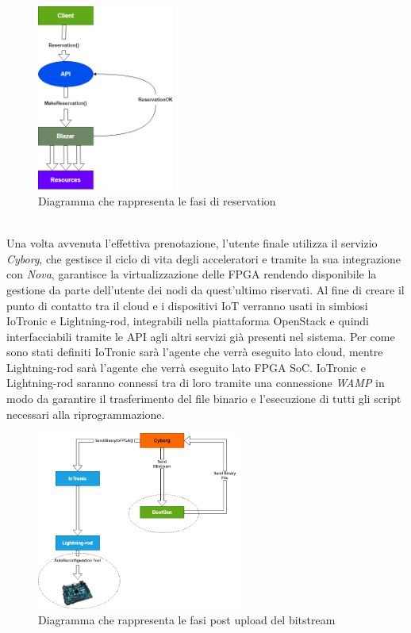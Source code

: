 \begin{figure}[h]
\centering
\includegraphics[width=0.4\textwidth]{images/Arch1.png}
\caption{Diagramma che rappresenta le fasi di reservation}
\end{figure}\\
Una volta avvenuta l'effettiva prenotazione, l'utente finale utilizza il servizio \textit{Cyborg},  che gestisce il ciclo di vita degli acceleratori e tramite la sua integrazione con \textit{Nova}, garantisce la virtualizzazione delle FPGA rendendo disponibile la gestione da parte dell'utente dei nodi da quest'ultimo riservati. Al fine di creare il punto di contatto tra il cloud e i dispositivi IoT verranno usati in simbiosi IoTronic e Lightning-rod, integrabili nella piattaforma OpenStack e quindi interfacciabili tramite le API agli altri servizi già presenti nel sistema. Per come sono stati definiti IoTronic sarà l'agente che verrà eseguito lato cloud, mentre Lightning-rod sarà l'agente che verrà eseguito lato FPGA SoC. IoTronic e Lightning-rod saranno connessi tra di loro tramite una connessione \textit{WAMP} in modo da garantire il trasferimento del file binario e l'esecuzione di tutti gli script necessari alla riprogrammazione.
\begin{figure}[h]
\centering
\includegraphics[width=0.6\textwidth]{images/Arch.png}
\caption{Diagramma che rappresenta le fasi post upload del bitstream}
\end{figure}\\

